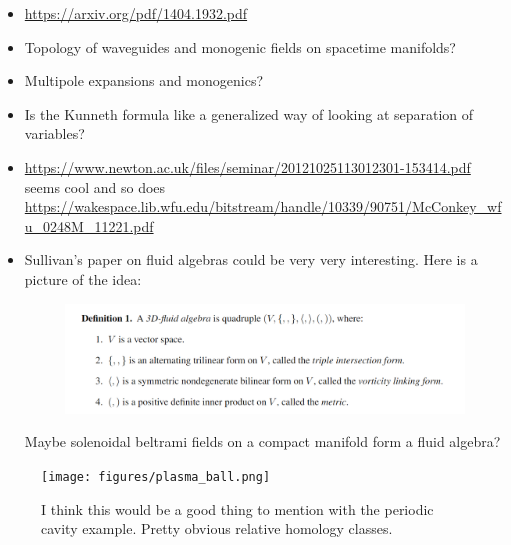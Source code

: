 \documentclass{article}
\begin{document}
\begin{itemize}
    \item \url{https://arxiv.org/pdf/1404.1932.pdf}
    \item Topology of waveguides and monogenic fields on spacetime manifolds?
    \item Multipole expansions and monogenics?
    \item Is the Kunneth formula like a generalized way of looking at separation of variables?
    \item \url{https://www.newton.ac.uk/files/seminar/20121025113012301-153414.pdf} seems cool and so does \url{https://wakespace.lib.wfu.edu/bitstream/handle/10339/90751/McConkey_wfu_0248M_11221.pdf}
    \item Sullivan's paper on fluid algebras could be very very interesting. Here is a picture of the idea:
    \begin{figure}[H]
        \centering
        \includegraphics{figures/fluid_algebra.png}
    \end{figure}
    Maybe solenoidal beltrami fields on a compact manifold form a fluid algebra?
\end{itemize}
\begin{figure}
    \centering
    \texttt{[image: figures/plasma\_ball.png]}
    \caption{I think this would be a good thing to mention with the periodic cavity example. Pretty obvious relative homology classes.}
\end{figure}
\end{document}
